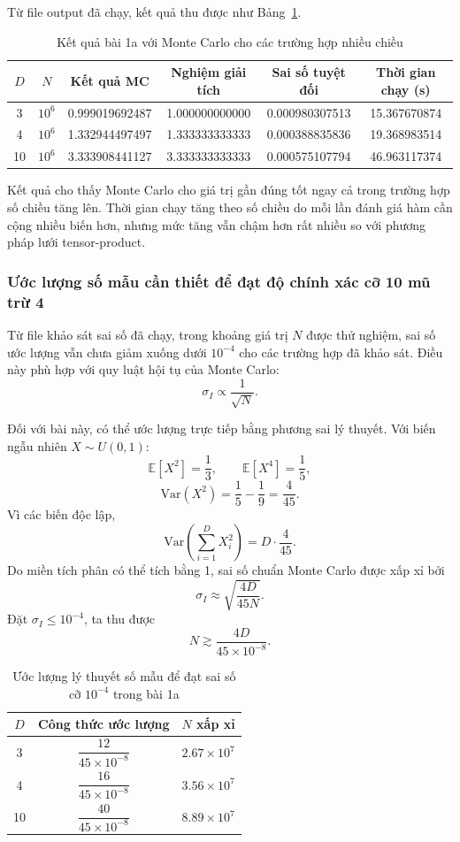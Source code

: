 \documentclass{article}
\begin{document}
Từ file output đã chạy, kết quả thu được như Bảng~\ref{tab:mc1a_ketqua}.

\begin{table}[H]
\centering
\caption{Kết quả bài 1a với Monte Carlo cho các trường hợp nhiều chiều}
\label{tab:mc1a_ketqua}
\begin{tabular}{cccccc}
\toprule
$D$ & $N$ & Kết quả MC & Nghiệm giải tích & Sai số tuyệt đối & Thời gian chạy (s) \\
\midrule
3  & $10^6$ & 0.999019692487 & 1.000000000000 & 0.000980307513 & 15.367670874 \\
4  & $10^6$ & 1.332944497497 & 1.333333333333 & 0.000388835836 & 19.368983514 \\
10 & $10^6$ & 3.333908441127 & 3.333333333333 & 0.000575107794 & 46.963117374 \\
\bottomrule
\end{tabular}
\end{table}

Kết quả cho thấy Monte Carlo cho giá trị gần đúng tốt ngay cả trong trường hợp số chiều tăng lên. Thời gian chạy tăng theo số chiều do mỗi lần đánh giá hàm cần cộng nhiều biến hơn, nhưng mức tăng vẫn chậm hơn rất nhiều so với phương pháp lưới tensor-product.

\subsubsection{Ước lượng số mẫu cần thiết để đạt độ chính xác cỡ 10 mũ trừ 4}

Từ file khảo sát sai số đã chạy, trong khoảng giá trị $N$ được thử nghiệm, sai số ước lượng vẫn chưa giảm xuống dưới $10^{-4}$ cho các trường hợp đã khảo sát. Điều này phù hợp với quy luật hội tụ của Monte Carlo:
\[
\sigma_I \propto \frac{1}{\sqrt{N}}.
\]

Đối với bài này, có thể ước lượng trực tiếp bằng phương sai lý thuyết. Với biến ngẫu nhiên $X \sim U(0,1)$:
\[
\mathbb{E}[X^2] = \frac{1}{3}, \qquad \mathbb{E}[X^4] = \frac{1}{5},
\]
\[
\mathrm{Var}(X^2) = \frac{1}{5} - \frac{1}{9} = \frac{4}{45}.
\]
Vì các biến độc lập,
\[
\mathrm{Var}\!\left(\sum_{i=1}^{D} X_i^2\right) = D\cdot \frac{4}{45}.
\]
Do miền tích phân có thể tích bằng 1, sai số chuẩn Monte Carlo được xấp xỉ bởi
\[
\sigma_I \approx \sqrt{\frac{4D}{45N}}.
\]
Đặt $\sigma_I \le 10^{-4}$, ta thu được
\[
N \gtrsim \frac{4D}{45\times 10^{-8}}.
\]

\begin{table}[H]
\centering
\caption{Ước lượng lý thuyết số mẫu để đạt sai số cỡ $10^{-4}$ trong bài 1a}
\label{tab:mc1a_N}
\begin{tabular}{ccc}
\toprule
$D$ & Công thức ước lượng & $N$ xấp xỉ \\
\midrule
3 & $\dfrac{12}{45\times 10^{-8}}$ & $2.67\times 10^7$ \\
4 & $\dfrac{16}{45\times 10^{-8}}$ & $3.56\times 10^7$ \\
10 & $\dfrac{40}{45\times 10^{-8}}$ & $8.89\times 10^7$ \\
\bottomrule
\end{tabular}
\end{table}
\end{document}
